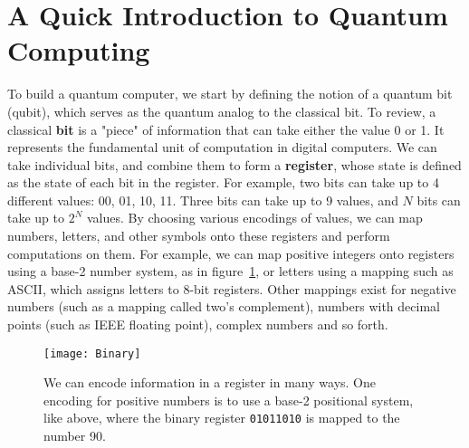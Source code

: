 \section{A Quick Introduction to Quantum Computing}
\label{sec:qc}
To build a quantum computer, we start by defining the notion of a quantum bit (qubit), which
serves as the quantum analog to the classical bit. To review, a classical \textbf{bit} is a "piece" of information
that can take either the value 0 or 1. It represents the fundamental unit of computation in digital computers.
We can take individual bits, and combine them to form a \textbf{register}, whose state is defined as 
the state of each bit in the register. For example, two bits can take up to 4 different
values: 00, 01, 10, 11. Three bits can take up to 9 values, and $N$ bits can take up to $2^N$ values. 
By choosing various encodings of values, we can map numbers, letters, and other symbols onto these registers
and perform computations on them. For example, we can map positive integers onto registers using a base-2 number 
system, as in figure~\ref{fig:binary}, or letters using a mapping such as ASCII, which assigns letters to 8-bit registers.
Other mappings exist for negative numbers (such as a mapping called two's complement), numbers with
decimal points (such as IEEE floating point), complex numbers and so forth. 

\begin{figure}
  \texttt{[image: Binary]}
  \caption[Binary Coding]
  {We can encode information in a register in many ways. One encoding for positive numbers is to use a base-2
  positional system, like above, where the binary register \texttt{01011010} is mapped to the number 90.}
  \label{fig:binary}
\end{figure}

